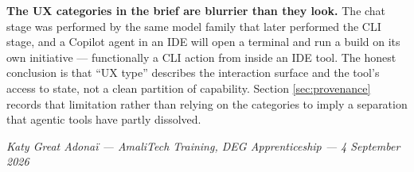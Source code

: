 \documentclass[11pt,a4paper]{article}
\begin{document}
\textbf{The UX categories in the brief are blurrier than they look.} The chat
stage was performed by the same model family that later performed the CLI
stage, and a Copilot agent in an IDE will open a terminal and run a build on
its own initiative --- functionally a CLI action from inside an IDE tool. The
honest conclusion is that ``UX type'' describes the interaction surface and the
tool's access to state, not a clean partition of capability. Section
\ref{sec:provenance} records that limitation rather than relying on the
categories to imply a separation that agentic tools have partly dissolved.

\vfill
\begin{center}
\small
\textit{Katy Great Adona\"i --- AmaliTech Training, DEG Apprenticeship ---
4 September 2026}
\end{center}
\end{document}
